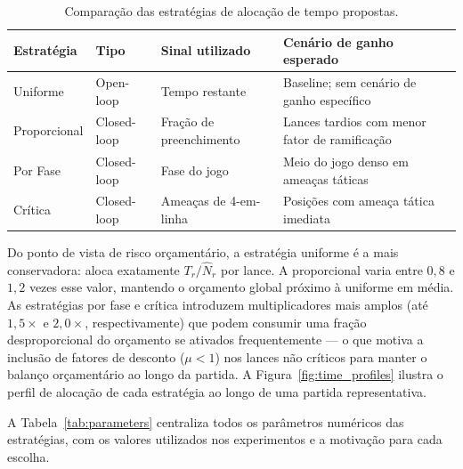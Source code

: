 \documentclass[cic,tc]{iiufrgs}
\begin{document}
\begin{table}[htbp]
    \centering
    \caption{Comparação das estratégias de alocação de tempo propostas.}
    \label{tab:strategies_comparison}
    \begin{tabular}{lllp{5cm}}
        \hline
        \textbf{Estratégia} & \textbf{Tipo} & \textbf{Sinal utilizado} & \textbf{Cenário de ganho esperado} \\
        \hline
        Uniforme    & Open-loop   & Tempo restante           & Baseline; sem cenário de ganho específico \\
        Proporcional & Closed-loop & Fração de preenchimento  & Lances tardios com menor fator de ramificação \\
        Por Fase    & Closed-loop & Fase do jogo             & Meio do jogo denso em ameaças táticas \\
        Crítica     & Closed-loop & Ameaças de 4-em-linha    & Posições com ameaça tática imediata \\
        \hline
    \end{tabular}
\end{table}

Do ponto de vista de risco orçamentário, a estratégia uniforme é a mais conservadora: aloca exatamente $T_r / \hat{N}_r$ por lance. A proporcional varia entre $0{,}8$ e $1{,}2$ vezes esse valor, mantendo o orçamento global próximo à uniforme em média. As estratégias por fase e crítica introduzem multiplicadores mais amplos (até $1{,}5\times$ e $2{,}0\times$, respectivamente) que podem consumir uma fração desproporcional do orçamento se ativados frequentemente — o que motiva a inclusão de fatores de desconto ($\mu < 1$) nos lances não críticos para manter o balanço orçamentário ao longo da partida. A Figura~\ref{fig:time_profiles} ilustra o perfil de alocação de cada estratégia ao longo de uma partida representativa.

A Tabela~\ref{tab:parameters} centraliza todos os parâmetros numéricos das estratégias, com os valores utilizados nos experimentos e a motivação para cada escolha.
\end{document}
